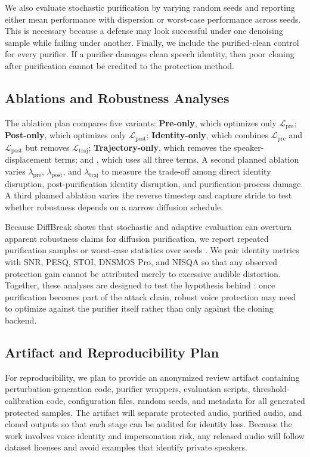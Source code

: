 We also evaluate stochastic purification by varying random seeds and reporting either mean performance with dispersion or worst-case performance across seeds. 
This is necessary because a defense may look successful under one denoising sample while failing under another. 
Finally, we include the purified-clean control for every purifier. If a purifier damages clean speech identity, then poor cloning after purification cannot be credited to the protection method.

\subsection{Ablations and Robustness Analyses}

The ablation plan compares five variants: \textbf{Pre-only}, which optimizes only $\mathcal{L}_{\text{pre}}$; \textbf{Post-only}, which optimizes only $\mathcal{L}_{\text{post}}$; 
\textbf{Identity-only}, which combines $\mathcal{L}_{\text{pre}}$ and $\mathcal{L}_{\text{post}}$ but removes $\mathcal{L}_{\text{traj}}$; \textbf{Trajectory-only}, which removes the speaker-displacement terms; 
and \textbf{\method{}}, which uses all three terms.
A second planned ablation varies $\lambda_{\text{pre}}$, $\lambda_{\text{post}}$, and $\lambda_{\text{traj}}$ to measure the trade-off among direct identity disruption, post-purification identity disruption, and purification-process damage. 
A third planned ablation varies the reverse timestep and capture stride to test whether robustness depends on a narrow diffusion schedule.

Because DiffBreak shows that stochastic and adaptive evaluation can overturn apparent robustness claims for diffusion purification, 
we report repeated purification samples or worst-case statistics over seeds \cite{kassis2025diffbreak}. 
We pair identity metrics with SNR, PESQ, STOI, DNSMOS Pro, and NISQA so that any observed protection gain cannot be attributed merely to excessive audible distortion. 
Together, these analyses are designed to test the hypothesis behind \method{}: once purification becomes part of the attack chain, 
robust voice protection may need to optimize against the purifier itself rather than only against the cloning backend.

\subsection{Artifact and Reproducibility Plan}

For reproducibility, we plan to provide an anonymized review artifact containing perturbation-generation code, purifier wrappers, evaluation scripts, 
threshold-calibration code, configuration files, random seeds, and metadata for all generated protected samples. 
The artifact will separate protected audio, purified audio, and cloned outputs so that each stage can be audited for identity loss. 
Because the work involves voice identity and impersonation risk, any released audio will follow dataset licenses and avoid examples that identify private speakers.
